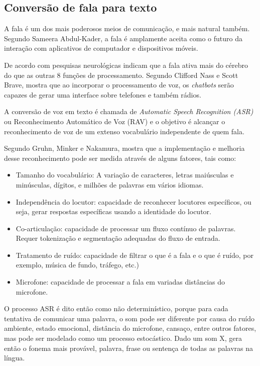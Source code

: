 \documentclass[
	12pt,				%
	oneside,
	a4paper,			%
	english,			%
	french,				%
	spanish,			%
	brazil				%
	]{abntex2}
\begin{document}
\subsection{Conversão de fala para texto}
A fala é um dos mais poderosos meios de comunicação, e mais natural também. Segundo Sameera Abdul-Kader\supercite{Abdul-Kader2015}, a fala é amplamente aceita como o futuro da interação com aplicativos de computador e dispositivos móveis.
 
De acordo com pesquisas neurológicas indicam que a fala ativa mais do cérebro do que as outras 8 funções de processamento. Segundo Clifford Nass e Scott Brave\supercite{wired-for-speech}, mostra que ao incorporar o processamento de voz, os \emph{chatbots} serão capazes de gerar uma interface sobre telefones e também rádios.
 
A conversão de voz em texto é chamada de \emph{Automatic Speech Recognition (ASR)} ou Reconhecimento Automático de Voz (RAV) e o objetivo é alcançar o reconhecimento de voz de um extenso vocabulário independente de quem fala.

Segundo Gruhn, Minker e Nakamura\supercite{wired-for-speech-2}, mostra que a implementação e melhoria desse reconhecimento pode ser medida através de alguns fatores, tais como:

\begin{itemize}
	\item Tamanho do vocabulário: A variação de caracteres, letras maiúsculas e minúsculas, dígitos, e milhões de palavras em vários idiomas.
	\item Independência do locutor: capacidade de reconhecer locutores específicos, ou seja, gerar respostas específicas usando a identidade do locutor.
	\item Co-articulação: capacidade de processar um fluxo contínuo de palavras. Requer tokenização e segmentação adequadas do fluxo de entrada.
	\item Tratamento de ruído: capacidade de filtrar o que é a fala e o que é ruído, por exemplo, música de fundo, tráfego, etc.)
	\item Microfone: capacidade de processar a fala em variadas distâncias do microfone.
\end{itemize}

O processo ASR é dito então como não determinístico, porque para cada tentativa de comunicar uma palavra, o som pode ser diferente por causa do ruído ambiente, estado emocional, distância do microfone, cansaço, entre outros fatores, mas pode ser modelado como um processo estocástico. Dado um som X, gera então o fonema mais provável, palavra, frase ou sentença de todas as palavras na língua.
\end{document}

